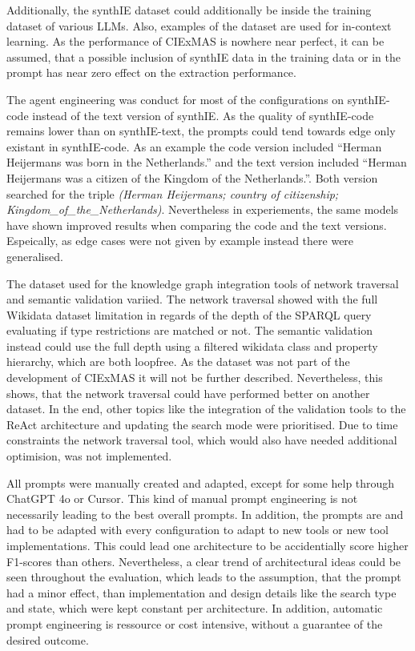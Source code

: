 \documentclass[a4paper,oneside,bibliography=totoc]{scrbook}
\begin{document}
Additionally, the synthIE dataset could additionally be inside the training dataset of various \acp{LLM}. Also, examples of the dataset are used for in-context learning. As the performance of CIExMAS is nowhere near perfect, it can be assumed, that a possible inclusion of synthIE data in the training data or in the prompt has near zero effect on the extraction performance.

The agent engineering was conduct for most of the configurations on synthIE-code instead of the text version of synthIE. As the quality of synthIE-code remains lower than on synthIE-text, the prompts could tend towards edge only existant in synthIE-code. As an example the code version included \enquote{Herman Heijermans was born in the Netherlands.} and the text version included \enquote{Herman Heijermans was a citizen of the Kingdom of the Netherlands.}. Both version searched for the triple \textit{(Herman Heijermans; country of citizenship; Kingdom\_of\_the\_Netherlands)}. Nevertheless in experiements, the same models have shown improved results when comparing the code and the text versions. Espeically, as edge cases were not given by example instead there were generalised.

The dataset used for the knowledge graph integration tools of network traversal and semantic validation variied. The network traversal showed with the full Wikidata dataset limitation in regards of the depth of the SPARQL query evaluating if type restrictions are matched or not. The semantic validation instead could use the full depth using a filtered wikidata class and property hierarchy, which are both loopfree. As the dataset was not part of the development of CIExMAS it will not be further described. Nevertheless, this shows, that the network traversal could have performed better on another dataset. In the end, other topics like the integration of the validation tools to the ReAct architecture and updating the search mode were prioritised. Due to time constraints the network traversal tool, which would also have needed additional optimision, was not implemented.

All prompts were manually created and adapted, except for some help through ChatGPT 4o or Cursor. This kind of manual prompt engineering is not necessarily leading to the best overall prompts. In addition, the prompts are and had to be adapted with every configuration to adapt to new tools or new tool implementations. This could lead one architecture to be accidentially score higher F1-scores than others. Nevertheless, a clear trend of architectural ideas could be seen throughout the evaluation, which leads to the assumption, that the prompt had a minor effect, than implementation and design details like the search type and state, which were kept constant per architecture. In addition, automatic prompt engineering is ressource or cost intensive, without a guarantee of the desired outcome.
\end{document}
